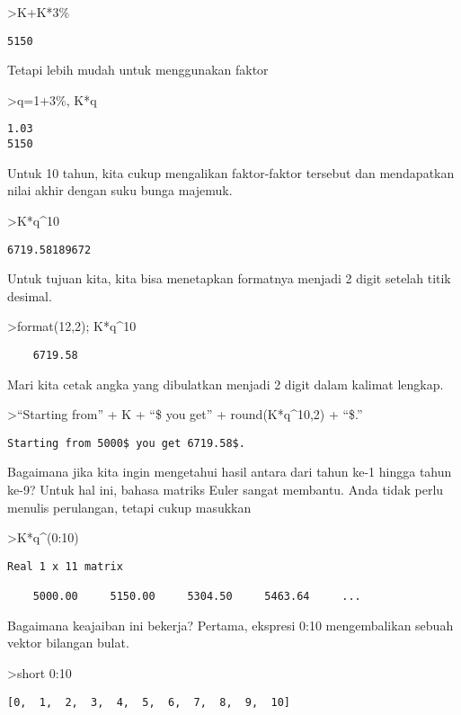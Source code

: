 \documentclass[
]{book}
\begin{document}
\textgreater K+K*3\%

\begin{verbatim}
5150
\end{verbatim}

Tetapi lebih mudah untuk menggunakan faktor

\textgreater q=1+3\%, K*q

\begin{verbatim}
1.03
5150
\end{verbatim}

Untuk 10 tahun, kita cukup mengalikan faktor-faktor tersebut dan mendapatkan nilai akhir dengan suku bunga majemuk.

\textgreater K*q\^{}10

\begin{verbatim}
6719.58189672
\end{verbatim}

Untuk tujuan kita, kita bisa menetapkan formatnya menjadi 2 digit setelah titik desimal.

\textgreater format(12,2); K*q\^{}10

\begin{verbatim}
    6719.58 
\end{verbatim}

Mari kita cetak angka yang dibulatkan menjadi 2 digit dalam kalimat lengkap.

\textgreater{}``Starting from'' + K + ``\$ you get'' + round(K*q\^{}10,2) + ``\$.''

\begin{verbatim}
Starting from 5000$ you get 6719.58$.
\end{verbatim}

Bagaimana jika kita ingin mengetahui hasil antara dari tahun ke-1 hingga tahun ke-9? Untuk hal ini, bahasa matriks Euler sangat membantu. Anda tidak perlu menulis perulangan, tetapi cukup masukkan

\textgreater K*q\^{}(0:10)

\begin{verbatim}
Real 1 x 11 matrix

    5000.00     5150.00     5304.50     5463.64     ...
\end{verbatim}

Bagaimana keajaiban ini bekerja? Pertama, ekspresi 0:10 mengembalikan sebuah vektor bilangan bulat.

\textgreater short 0:10

\begin{verbatim}
[0,  1,  2,  3,  4,  5,  6,  7,  8,  9,  10]
\end{verbatim}
\end{document}

